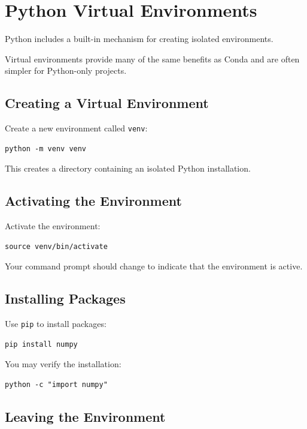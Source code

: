 \section{Python Virtual Environments}

Python includes a built-in mechanism for creating isolated environments.

Virtual environments provide many of the same benefits as Conda and are often simpler for Python-only projects.

\subsection{Creating a Virtual Environment}

Create a new environment called \texttt{venv}:

\begin{lstlisting}
python -m venv venv
\end{lstlisting}

This creates a directory containing an isolated Python installation.

\subsection{Activating the Environment}

Activate the environment:

\begin{lstlisting}
source venv/bin/activate
\end{lstlisting}

Your command prompt should change to indicate that the environment is active.

\subsection{Installing Packages}

Use \texttt{pip} to install packages:

\begin{lstlisting}
pip install numpy
\end{lstlisting}

You may verify the installation:

\begin{lstlisting}
python -c "import numpy"
\end{lstlisting}

\subsection{Leaving the Environment}

